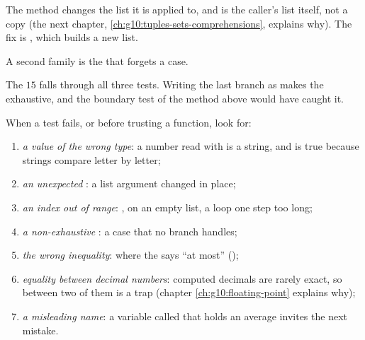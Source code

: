 \label{lst:g10:specifications-and-tests:side-effect}

\label{out:g10:specifications-and-tests:side-effect}

The method  changes the list it is applied to, and  is the caller's list itself, not a copy
(the next chapter, \ref{ch:g10:tuples-sets-comprehensions}, explains why). The fix is , which builds a new list.

A second family is the  that forgets a case.

\label{lst:g10:specifications-and-tests:missing-branch}

\label{out:g10:specifications-and-tests:missing-branch}

The  $15$ falls through all three tests. Writing the last branch as  makes the
 exhaustive, and the boundary test of the method above would have caught it.

\begin{method}\label{met:g10:specifications-and-tests:checklist}
When a test fails, or before trusting a function, look for:
\begin{enumerate}
  \item \emph{a value of the wrong type}: a number read with  is a string, and  is
    true because strings compare letter by letter;
  \item \emph{an unexpected }: a list argument changed in place;
  \item \emph{an index out of range}: ,  on an empty list, a loop one step too long;
  \item \emph{a non-exhaustive }: a case that no branch handles;
  \item \emph{the wrong inequality}: \code{<} where the  says ``at most'' (\code{<=});
  \item \emph{equality between decimal numbers}: computed decimals are rarely exact, so \code{==} between two of
    them is a trap (chapter \ref{ch:g10:floating-point} explains why);
  \item \emph{a misleading name}: a variable called  that holds an average invites the next mistake.
\end{enumerate}
\end{method}

